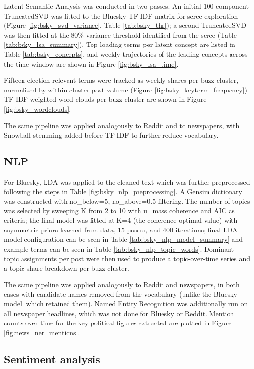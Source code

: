 Latent Semantic Analysis was conducted in two passes. An initial 100-component TruncatedSVD was fitted to the Bluesky TF-IDF matrix for scree exploration (Figure \ref{fig:bsky_svd_variance}, Table \ref{tab:bsky_thr}); a second TruncatedSVD was then fitted at the 80\%-variance threshold identified from the scree (Table \ref{tab:bsky_lsa_summary}). Top loading terms per latent concept are listed in Table \ref{tab:bsky_concepts}, and weekly trajectories of the leading concepts across the time window are shown in Figure \ref{fig:bsky_lsa_time}.

Fifteen election-relevant terms were tracked as weekly shares per buzz cluster, normalised by within-cluster post volume (Figure \ref{fig:bsky_keyterm_frequency}). TF-IDF-weighted word clouds per buzz cluster are shown in Figure \ref{fig:bsky_wordclouds}.

The same pipeline was applied analogously to Reddit and to newspapers, with Snowball stemming added before TF-IDF to further reduce vocabulary.

\subsection{NLP}

For Bluesky, LDA was applied to the cleaned text which was further preprocessed following the steps in Table \ref{fig:bsky_nlp_preprocessing}. A Gensim dictionary was constructed with no\_below=5, no\_above=0.5 filtering. The number of topics was selected by sweeping K from 2 to 10 with u\_mass coherence and AIC as criteria; the final model was fitted at K=4 (the coherence-optimal value) with asymmetric priors learned from data, 15 passes, and 400 iterations; final LDA model configuration can be seen in Table \ref{tab:bsky_nlp_model_summary} and example terms can be seen in Table \ref{tab:bsky_nlp_topic_words}. Dominant topic assignments per post were then used to produce a topic-over-time series and a topic-share breakdown per buzz cluster.

The same pipeline was applied analogously to Reddit and newspapers, in both cases with candidate names removed from the vocabulary (unlike the Bluesky model, which retained them). Named Entity Recognition was additionally run on all newspaper headlines, which was not done for Bluesky or Reddit. Mention counts over time for the key political figures extracted are plotted in Figure \ref{fig:news_ner_mentions}.

\subsection{Sentiment analysis}

